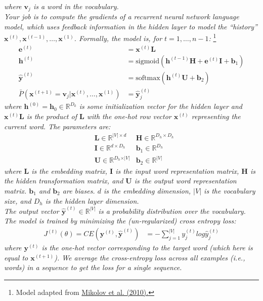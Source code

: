 \documentclass[fleqn]{MJD}
\newcommand{\0}{\emptyset}
\begin{document}
\noindent \textit{where $\bm{v}_{j}$ is a word in the vocabulary.} \\

\noindent \textit{Your job is to compute the gradients of a recurrent neural network language model, which uses feedback information in the hidden layer to model the ``history'' $\bm{x}^{(t)}, \bm{x}^{(t-1)}, \dots, \bm{x}^{(1)}$. Formally, the model is, for $t = 1, \dots, n-1$:}%
\footnote{Model adapted from \hyperref{http://www.fit.vutbr.cz/research/groups/speech/publi/2010/mikolov_interspeech2010_IS100722.pdf}{}{}{Mikolov et al. (2010).}} %
%
\begin{align}
	\bm{e}^{(t)} &= \bm{x}^{(t)}\bm{L} \\
	\bm{h}^{(t)} &= \text{sigmoid} \left( \bm{h}^{(t-1)}\bm{H} + \bm{e}^{(t)}\bm{I} + \bm{b}_{1} \right)\\
	\hat{\bm{y}}^{(t)} &= \text{softmax}  \left( \bm{h}^{(t)}\bm{U} + \bm{b}_{2} \right) \\
	\bar{P}\left( \bm{x}^{(t+1)} = \bm{v}_{j} \vert \bm{x}^{(t)}, \dots, \bm{x}^{(1)} \right) &= \hat{\bm{y}}_{j}^{(t)}
\end{align}
%
\noindent \textit{where $\bm{h}^{(0)} = \bm{h}_{0} \in \mathbb{R}^{D_{k}}$ is some initialization vector for the hidden layer and $\bm{x}^{(t)}\bm{L}$ is the product of $\bm{L}$ with the one-hot row vector $\bm{x}^{(t)}$ representing the current word. The parameters are: }
%
\begin{align}
	&\bm{L} \in \mathbb{R}^{\vert V \vert \times d} 
	&\bm{H} \in \mathbb{R}^{D_{h} \times D_{h}} \\ 
	&\bm{I} \in \mathbb{R}^{d \times D_{h}} 
	&\bm{b}_{1} \in \mathbb{R}^{D_{h}} \\ 
	& \bm{U} \in \mathbb{R}^{D_{h} \times \vert V \vert} 
	& \bm{b}_{2} \in \mathbb{R}^{\vert V \vert} 
\end{align}
%
\noindent \textit{where $\bm{L}$ is the embedding matrix, $\bm{I}$ is the input word representation matrix, $\bm{H}$ is the hidden transformation matrix, and $\bm{U}$ is the output word representation matrix. $\bm{b}_{1}$ and $\bm{b}_{2}$ are biases. $d$ is the embedding dimension, $\vert V \vert$ is the vocabulary size, and $D_{h}$ is the hidden layer dimension.} \\

\noindent \textit{The output vector $\hat{\bm{y}}^{(t)} \in \mathbb{R}^{\vert V \vert}$ is a probability distribution over the vocabulary. The model is trained by minimizing the (un-regularized) cross entropy loss:}
%
\begin{align}
	J^{(t)}(\theta) = CE(\bm{y}^{(t)} , \hat{\bm{y}}^{(t)}) &= - \sum_{j=1}^{\vert V \vert} y_{j}^{(t)} log \hat{y}_{j}^{(t)}
\end{align}
% 
\noindent \textit{where $\bm{y}^{(t)}$ is the one-hot vector corresponding to the target word (which here is equal to $\bm{x}^{(t+1)}$). We average the cross-entropy loss across all examples (i.e., words) in a sequence to get the loss for a single sequence.}
\end{document}

